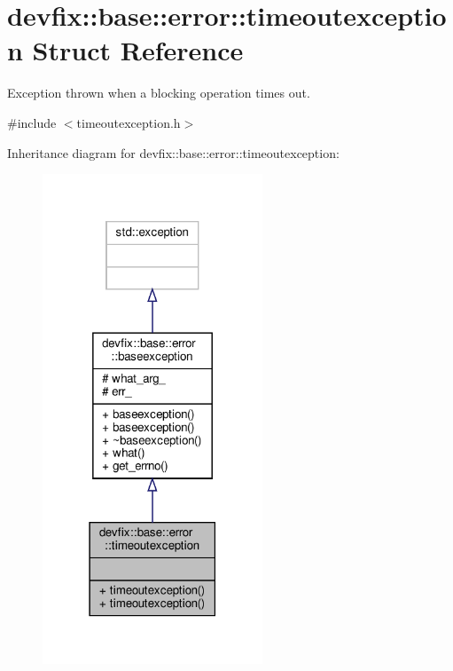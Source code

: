 \hypertarget{structdevfix_1_1base_1_1error_1_1timeoutexception}{}\section{devfix\+:\+:base\+:\+:error\+:\+:timeoutexception Struct Reference}
\label{structdevfix_1_1base_1_1error_1_1timeoutexception}


Exception thrown when a blocking operation times out.  




{\ttfamily \#include $<$timeoutexception.\+h$>$}



Inheritance diagram for devfix\+:\+:base\+:\+:error\+:\+:timeoutexception\+:\nopagebreak
\begin{figure}[H]
\begin{center}
\leavevmode
\includegraphics[width=186pt]{structdevfix_1_1base_1_1error_1_1timeoutexception__inherit__graph}
\end{center}
\end{figure}


